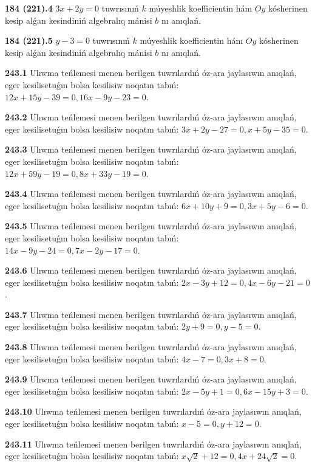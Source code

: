 \documentclass{article}
\begin{document}
\textbf{184 (221).4} $3x+2y=0$ tuwrısınıń $k$ múyeshlik
koefficientin hám $Oy$ kósherinen kesip alǵan kesindiniń algebralıq
mánisi $b$ nı anıqlań.

\textbf{184 (221).5} $y-3=0$ tuwrısınıń $k$ múyeshlik
koefficientin hám $Oy$ kósherinen kesip alǵan kesindiniń algebralıq
mánisi $b$ nı anıqlań.

\textbf{243.1} Ulıwma teńlemesi menen berilgen tuwrılardıń
óz-ara jaylasıwın anıqlań, eger kesilisetuǵın bolsa kesilisiw noqatın 
tabıń: $12x+15y-39=0, 16x-9y-23=0$.

\textbf{243.2} Ulıwma teńlemesi menen berilgen tuwrılardıń      
óz-ara jaylasıwın anıqlań, eger kesilisetuǵın bolsa kesilisiw noqatın 
tabıń: $3x+2y-27=0, x+5y-35=0$.

\textbf{243.3} Ulıwma teńlemesi menen berilgen tuwrılardıń      
óz-ara jaylasıwın anıqlań, eger kesilisetuǵın bolsa kesilisiw noqatın 
tabıń: $12x+59y-19=0, 8x+33y-19=0$.

\textbf{243.4} Ulıwma teńlemesi menen berilgen tuwrılardıń      
óz-ara jaylasıwın anıqlań, eger kesilisetuǵın bolsa kesilisiw noqatın 
tabıń: $6x+10y+9=0, 3x+5y-6=0$.

\textbf{243.5} Ulıwma teńlemesi menen berilgen tuwrılardıń      
óz-ara jaylasıwın anıqlań, eger kesilisetuǵın bolsa kesilisiw noqatın 
tabıń: $14x-9y-24=0, 7x-2y-17=0$.

\textbf{243.6} Ulıwma teńlemesi menen berilgen tuwrılardıń      
óz-ara jaylasıwın anıqlań, eger kesilisetuǵın bolsa kesilisiw noqatın
tabıń: $2x-3y+12=0, 4x-6y-21=0$.

\textbf{243.7} Ulıwma teńlemesi menen berilgen tuwrılardıń      
óz-ara jaylasıwın anıqlań, eger kesilisetuǵın bolsa kesilisiw noqatın
tabıń: $2y+9=0, y-5=0$.

\textbf{243.8} Ulıwma teńlemesi menen berilgen tuwrılardıń      
óz-ara jaylasıwın anıqlań, eger kesilisetuǵın bolsa kesilisiw noqatın
tabıń: $4x-7=0, 3x+8=0$.

\textbf{243.9} Ulıwma teńlemesi menen berilgen tuwrılardıń
óz-ara jaylasıwın anıqlań, eger kesilisetuǵın bolsa kesilisiw noqatın
tabıń: $2x-5y+1=0, 6x-15y+3=0$.

\textbf{243.10} Ulıwma teńlemesi menen berilgen tuwrılardıń
óz-ara jaylasıwın anıqlań, eger kesilisetuǵın bolsa kesilisiw noqatın
tabıń: $x-5=0, y+12=0$.

\textbf{243.11} Ulıwma teńlemesi menen berilgen tuwrılardıń
óz-ara jaylasıwın anıqlań, eger kesilisetuǵın bolsa kesilisiw noqatın
tabıń: $x\sqrt{2}+12=0, 4x+24\sqrt{2}=0$.
\end{document}
